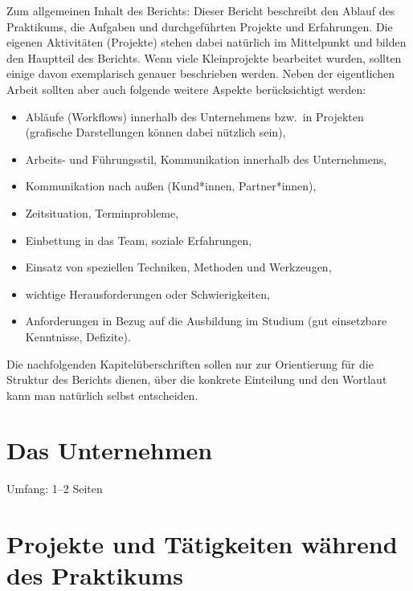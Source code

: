\documentclass[type=internship,theme=fhooe24,language=german,titlelanguage=german,smartquotes]{hgbthesis}
\begin{document}
Zum allgemeinen Inhalt des Berichts: Dieser Bericht beschreibt den Ablauf des
Praktikums, die Aufgaben und durchgeführten Projekte und Erfahrungen. Die
eigenen Aktivitäten (Projekte) stehen dabei natürlich im Mittelpunkt und bilden
den Hauptteil des Berichts. Wenn viele Kleinprojekte bearbeitet wurden, sollten
einige davon exemplarisch genauer beschrieben werden. Neben der eigentlichen
Arbeit sollten aber auch folgende weitere Aspekte berücksichtigt werden:
%
\begin{itemize}
	\item Abläufe (Workflows) innerhalb des Unternehmens bzw.\ in Projekten
	(grafische Darstellungen können dabei nützlich sein),
	\item Arbeits- und Führungsstil, Kommunikation innerhalb des Unternehmens,
	\item Kommunikation nach außen (Kund*innen, Partner*innen),
	\item Zeitsituation, Terminprobleme,
	\item Einbettung in das Team, soziale Erfahrungen,
	\item Einsatz von speziellen Techniken, Methoden und Werkzeugen,
	\item wichtige Herausforderungen oder Schwierigkeiten,
	\item Anforderungen in Bezug auf die Ausbildung im Studium (gut
	einsetzbare Kenntnisse, Defizite).
\end{itemize}
%
Die nachfolgenden Kapitelüberschriften sollen nur zur Orientierung für die
Struktur des Berichts dienen, über die konkrete Einteilung und den Wortlaut
kann man natürlich selbst entscheiden.

\mainmatter                             %

\chapter{Das Unternehmen}

Umfang: 1--2 Seiten


\chapter{Projekte und Tätigkeiten während des Praktikums}
\end{document}
